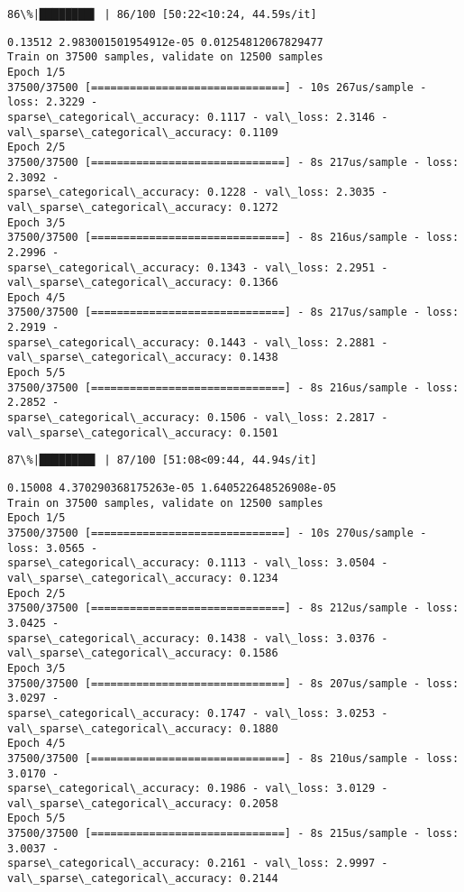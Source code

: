 \documentclass[11pt]{article}
\begin{document}
    \begin{Verbatim}[commandchars=\\\{\}]
 86\%|████████▌ | 86/100 [50:22<10:24, 44.59s/it]
    \end{Verbatim}

    \begin{Verbatim}[commandchars=\\\{\}]
0.13512 2.983001501954912e-05 0.01254812067829477
Train on 37500 samples, validate on 12500 samples
Epoch 1/5
37500/37500 [==============================] - 10s 267us/sample - loss: 2.3229 -
sparse\_categorical\_accuracy: 0.1117 - val\_loss: 2.3146 -
val\_sparse\_categorical\_accuracy: 0.1109
Epoch 2/5
37500/37500 [==============================] - 8s 217us/sample - loss: 2.3092 -
sparse\_categorical\_accuracy: 0.1228 - val\_loss: 2.3035 -
val\_sparse\_categorical\_accuracy: 0.1272
Epoch 3/5
37500/37500 [==============================] - 8s 216us/sample - loss: 2.2996 -
sparse\_categorical\_accuracy: 0.1343 - val\_loss: 2.2951 -
val\_sparse\_categorical\_accuracy: 0.1366
Epoch 4/5
37500/37500 [==============================] - 8s 217us/sample - loss: 2.2919 -
sparse\_categorical\_accuracy: 0.1443 - val\_loss: 2.2881 -
val\_sparse\_categorical\_accuracy: 0.1438
Epoch 5/5
37500/37500 [==============================] - 8s 216us/sample - loss: 2.2852 -
sparse\_categorical\_accuracy: 0.1506 - val\_loss: 2.2817 -
val\_sparse\_categorical\_accuracy: 0.1501
    \end{Verbatim}

    \begin{Verbatim}[commandchars=\\\{\}]
 87\%|████████▋ | 87/100 [51:08<09:44, 44.94s/it]
    \end{Verbatim}

    \begin{Verbatim}[commandchars=\\\{\}]
0.15008 4.370290368175263e-05 1.640522648526908e-05
Train on 37500 samples, validate on 12500 samples
Epoch 1/5
37500/37500 [==============================] - 10s 270us/sample - loss: 3.0565 -
sparse\_categorical\_accuracy: 0.1113 - val\_loss: 3.0504 -
val\_sparse\_categorical\_accuracy: 0.1234
Epoch 2/5
37500/37500 [==============================] - 8s 212us/sample - loss: 3.0425 -
sparse\_categorical\_accuracy: 0.1438 - val\_loss: 3.0376 -
val\_sparse\_categorical\_accuracy: 0.1586
Epoch 3/5
37500/37500 [==============================] - 8s 207us/sample - loss: 3.0297 -
sparse\_categorical\_accuracy: 0.1747 - val\_loss: 3.0253 -
val\_sparse\_categorical\_accuracy: 0.1880
Epoch 4/5
37500/37500 [==============================] - 8s 210us/sample - loss: 3.0170 -
sparse\_categorical\_accuracy: 0.1986 - val\_loss: 3.0129 -
val\_sparse\_categorical\_accuracy: 0.2058
Epoch 5/5
37500/37500 [==============================] - 8s 215us/sample - loss: 3.0037 -
sparse\_categorical\_accuracy: 0.2161 - val\_loss: 2.9997 -
val\_sparse\_categorical\_accuracy: 0.2144
    \end{Verbatim}
\end{document}

